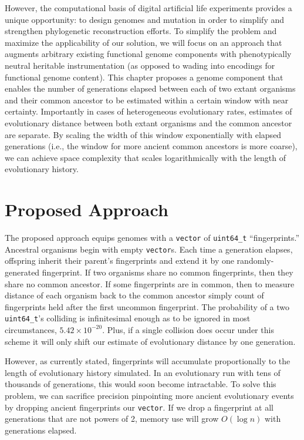 However, the computational basis of digital artificial life experiments provides a unique opportunity: to design genomes and mutation in order to simplify and strengthen phylogenetic reconstruction efforts.
To simplify the problem and maximize the applicability of our solution, we will focus on an approach that augments arbitrary existing functional genome components with phenotypically neutral heritable instrumentation \citep{stanley2002evolving} (as opposed to wading into encodings for functional genome content).
This chapter proposes a genome component that enables the number of generations elapsed between each of two extant organisms and their common ancestor to be estimated within a certain window with near certainty.
Importantly in cases of heterogeneous evolutionary rates, estimates of evolutionary distance between both extant organisms and the common ancestor are separate.
By scaling the width of this window exponentially with elapsed generations (i.e., the window for more ancient common ancestors is more coarse), we can achieve space complexity that scales logarithmically with the length of evolutionary history.

\section{Proposed Approach}

The proposed approach equips genomes with a \texttt{vector} of \texttt{uint64\_t} ``fingerprints.''
Ancestral organisms begin with empty \texttt{vector}s.
Each time a generation elapses, offspring inherit their parent's fingerprints and extend it by one randomly-generated fingerprint.
If two organisms share no common fingerprints, then they share no common ancestor.
If some fingerprints are in common, then to measure distance of each organism back to the common ancestor simply count of fingerprints held after the first uncommon fingerprint.
The probability of a two \texttt{uint64\_t}'s colliding is infinitesimal enough as to be ignored in most circumstances, $5.42\times10^{-20}$.
Plus, if a single collision does occur under this scheme it will only shift our estimate of evolutionary distance by one generation.

However, as currently stated, fingerprints will accumulate proportionally to the length of evolutionary history simulated.
In an evolutionary run with tens of thousands of generations, this would soon become intractable.
To solve this problem, we can sacrifice precision pinpointing more ancient evolutionary events by dropping ancient fingerprints our \texttt{vector}.
If we drop a fingerprint at all generations that are not powers of 2, memory use will grow $O(\log n)$ with generations elapsed.

